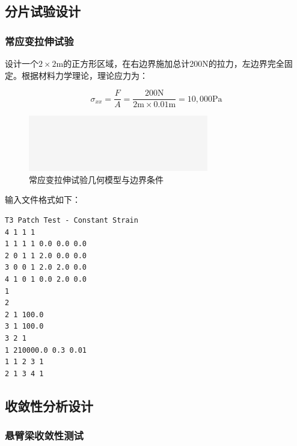 \documentclass[12pt,a4paper]{article}
\begin{document}

\subsection{分片试验设计}

\subsubsection{常应变拉伸试验}

设计一个$2 \times 2$m的正方形区域，在右边界施加总计200N的拉力，左边界完全固定。根据材料力学理论，理论应力为：

\begin{equation}
\sigma_{xx} = \frac{F}{A} = \frac{200\text{N}}{2\text{m} \times 0.01\text{m}} = 10,000 \text{Pa}
\end{equation}

\begin{figure}[H]
\centering
\includegraphics[width=0.7\textwidth]{img/empty.png}
\caption{常应变拉伸试验几何模型与边界条件}
\label{fig:constant_strain_test}
\end{figure}

输入文件格式如下：

\begin{lstlisting}[caption=常应变拉伸试验输入文件]
T3 Patch Test - Constant Strain
4 1 1 1
1 1 1 1 0.0 0.0 0.0
2 0 1 1 2.0 0.0 0.0
3 0 0 1 2.0 2.0 0.0
4 1 0 1 0.0 2.0 0.0
1
2
2 1 100.0
3 1 100.0
3 2 1
1 210000.0 0.3 0.01
1 1 2 3 1
2 1 3 4 1
\end{lstlisting}

\subsection{收敛性分析设计}

\subsubsection{悬臂梁收敛性测试}
\end{document}
